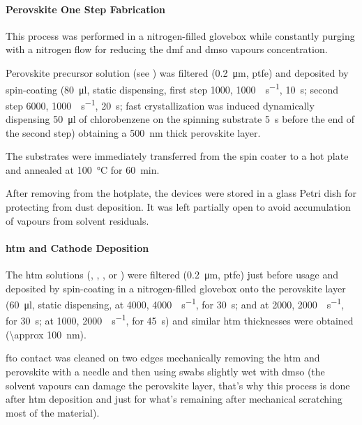 
		\paragraph{ Perovskite One Step Fabrication}

			This process was performed in a nitrogen-filled glovebox
			while constantly purging with a nitrogen flow for reducing the \gls{dmf} and \gls{dmso} vapours concentration.

			Perovskite precursor solution (see ) was filtered (\SI{0.2}{\um}, \gls{ptfe})
			and deposited by spin-coating (\SI{80}{\ul}, static dispensing, first step \SI{1000}{\rpm}, \SI{1000}{\rpm\per\s}, \SI{10}{\s};
			second step \SI{6000}{\rpm}, \SI{1000}{\rpm\per\s}, \SI{20}{\s}; fast crystallization was induced dynamically
			dispensing \SI{50}{\ul} of chlorobenzene on the spinning substrate \SI{5}{\s} before the end of the second
			step) obtaining a \SI{500}{\nm} thick perovskite layer.

			The substrates were immediately transferred from
			the spin coater to a hot plate and annealed at \SI{100}{\celsius} for \SI{60}{\minute}.

			After removing from the hotplate, the devices were stored in a glass Petri dish for protecting from dust deposition. It was left partially open to avoid accumulation of vapours from solvent residuals.

		\paragraph{\Gls{htm} and Cathode Deposition}

			The \gls{htm} solutions (\spiro, , , or ) were filtered (\SI{0.2}{\um}, \gls{ptfe}) just before usage and deposited by spin-coating in a nitrogen-filled glovebox
			onto the perovskite layer (\SI{60}{\ul}, static dispensing, \spiro at \SI{4000}{\rpm}, \SI{4000}{\rpm\per\s},
			for \SI{30}{\s};  and  at \SI{2000}{\rpm}, \SI{2000}{\rpm\per\s}, for \SI{30}{\s};  at \SI{1000}{\rpm}, \SI{2000}{\rpm\per\s},
			for \SI{45}{\s}) and similar \gls{htm} thicknesses were obtained (\SI{\approx 100}{\nm}).

			\Gls{fto} contact was cleaned on two edges mechanically removing the \gls{htm} and perovskite with a needle and then using swabs slightly wet with \gls{dmso} (the solvent vapours can damage the perovskite layer, that's why this process is done after \gls{htm} deposition and just for what's remaining after mechanical scratching most of the material).

